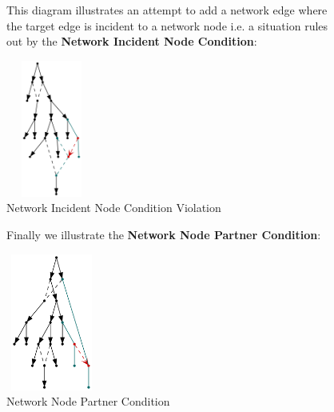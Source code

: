 \documentclass[11pt]{article}
\begin{document}
\begin{figure}
\noindent This diagram illustrates an attempt to add a network edge where the target edge is incident to a network node i.e. a situation rules out by the \textbf{Network Incident Node Condition}:
\vspace{2mm}
  \begin{center}
  \includegraphics[width=30mm, height=45mm]{hasE2IncidentNetworkNode.png}
  \caption{Network Incident Node Condition Violation}
  \label{fig:hasE2IncidentNetworkNode}
  \end{center}
\end{figure}


\begin{figure}
\noindent Finally we illustrate the \textbf{Network Node Partner Condition}:
\vspace{2mm}
  \begin{center}
  \includegraphics[width=30mm, height=45mm]{e2NetworkEdgeComplementNodeAncestralToE1.png}
  \caption{Network Node Partner Condition}
  \label{fig:e2NetworkEdgeComplementNodeAncestralToE1}
  \end{center}
\end{figure}
\end{document}
